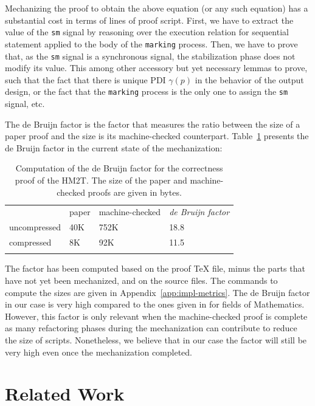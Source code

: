 \documentclass[pdflatex,sn-mathphys]{sn-jnl}%
\theoremstyle{thmstyleone}%
\theoremstyle{thmstyletwo}%
\theoremstyle{thmstylethree}%
\begin{document}
Mechanizing the proof to obtain the above equation (or any such
equation) has a substantial cost in terms of lines of proof
script. First, we have to extract the value of the \texttt{sm} signal
by reasoning over the execution relation for sequential statement
applied to the body of the \texttt{marking} process. Then, we have to
prove that, as the \texttt{sm} signal is a synchronous signal, the
stabilization phase does not modify its value. This among other
accessory but yet necessary lemmas to prove, such that the fact that
there is unique PDI $\gamma(p)$ in the behavior of the output design,
or the fact that the \texttt{marking} process is the only one to
assign the \texttt{sm} signal, etc. %

The de Bruijn factor \cite{Wiedijk2000} is the factor that measures
the ratio between the size of a paper proof and the size is its
machine-checked counterpart. Table~\ref{tab:de-bruijn} presents the de
Bruijn factor in the current state of the mechanization:

\begin{table}[!htbp]
\begin{tabular}{llll}
  & paper & machine-checked & \textit{de Bruijn factor} \\ \cline{2-4}
  uncompressed & 40K & 752K & 18.8 \\
  compressed   & 8K & 92K & 11.5 \\ \cline{2-4}
  & & &
\end{tabular}
\caption{Computation of the de Bruijn factor for the correctness proof
  of the HM2T. The size of the paper and machine-checked proofs are
  given in bytes.}
\label{tab:de-bruijn}
\end{table}

The factor has been computed based on the proof \TeX{} file, minus the
parts that have not yet been mechanized, and on the \coq{} source
files. The commands to compute the sizes are given in
Appendix~\ref{app:impl-metrics}. The de Bruijn factor in our case is
very high compared to the ones given in \cite{Wiedijk2000} for fields
of Mathematics. However, this factor is only relevant when the
machine-checked proof is complete as many refactoring phases during
the mechanization can contribute to reduce the size of
scripts. Nonetheless, we believe that in our case the factor will
still be very high even once the mechanization completed.

\section{Related Work}
\label{sec:related-work}
\end{document}
